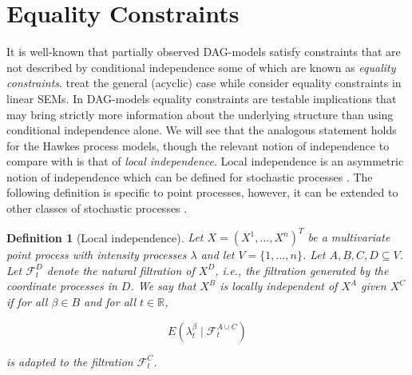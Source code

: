 \documentclass[accepted]{uai2021} %
\newtheorem{defn}[thm]{Definition}
\begin{document}
\begin{comment}
\begin{proof}
	In Equation \ref{eq:covCauFunc}, we note that $\phi_{\beta\alpha}$ only 
	appears in the $\beta$-row of the equations. Every parent of $\beta$ is 
	observed and therefore this row only depends on observed quantities. If 
	there were two solutions to the equations in the $\beta$-row such that 
	$\phi_{\beta\alpha}$ differed between the two solutions, then there would 
	also 
	be two solutions to Equation (\ref{eq:covCauFunc}) which is a contradiction.
\end{proof}

Under the conditions of Proposition \ref{prop:gPaId}, it also follows 
immediately that $\Phi_{\beta\alpha}$ is identified from the observed 
infinitesimal covariance process and $\Lambda_{OO}$ we will use this in Section 
\ref{ssec:eqInfCov} to obtain further constraints.

\end{comment}


\section{Equality Constraints}
\label{sec:eq}

It is well-known that partially observed DAG-models satisfy 
constraints that 
are not described by conditional independence some of which are known as 
\emph{equality constraints}. \cite{richardson2017} treat the general (acyclic) 
case 
while \cite{chen2014, chenNIPS2016} consider equality constraints in linear 
SEMs. In DAG-models equality constraints are testable implications that may 
bring strictly more information about the underlying structure than using 
conditional independence alone. We will see that the analogous statement holds 
for the Hawkes process models, though the relevant notion of independence to 
compare with is 
that of \emph{local independence}. Local independence is an asymmetric notion 
of independence which can be defined 
for stochastic processes \citep{schweder1970, aalen1987, didelez2000, 
didelez2008}. The following definition is specific to point processes, however, 
it can be extended to other classes of stochastic processes 
\citep{aalen1987,didelez2006,mogensenUAI2018,mogensen2018}.

\begin{defn}[Local independence]
	Let $X = (X^1,\ldots,X^n)^T$ be a multivariate point process with intensity 
	processes $\lambda$ and let $V=\{1,\ldots,n\}$. Let $A,B,C,D \subseteq V$. 
	Let $\mathcal{F}_t^D$ denote the natural filtration of $X^D$, i.e., the 
	filtration generated by the coordinate processes in $D$. We say that $X^B$ 
	is \emph{locally independent of $X^A$ given $X^C$} if for all $\beta\in B$ 
	and 
	for all $t\in \mathbb{R}$,
	
	$$
	E(\lambda_t^\beta \mid \mathcal{F}_t^{A\cup C})
	$$
	
	is adapted to the filtration $\mathcal{F}_t^C$.
	\label{def:li}
\end{defn}
\end{document}
